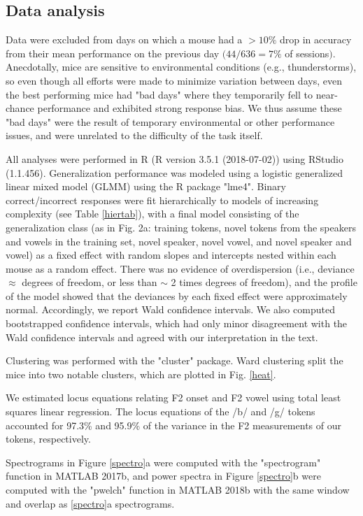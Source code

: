 \documentclass[11pt]{article}\usepackage[]{graphicx}\usepackage[]{color}
\begin{document}
\subsection{Data analysis}
Data were excluded from days on which a mouse had a $>10\%$ drop in accuracy from their mean performance on the previous day $(44/636 = 7\%$ of sessions$)$. Anecdotally, mice are sensitive to environmental conditions (e.g., thunderstorms), so even though all efforts were made to minimize variation between days, even the best performing mice had "bad days" where they temporarily fell to near-chance performance and exhibited strong response bias. We thus assume these "bad days" were the result of temporary environmental or other performance issues, and were unrelated to the difficulty of the task itself. 

All analyses were performed in R (R version 3.5.1 (2018-07-02))\cite{Team2016} using RStudio (1.1.456)\cite{Team2015}. Generalization performance was modeled using a logistic generalized linear mixed model (GLMM) using the R package "lme4"\cite{Bates2015}. Binary correct/incorrect responses were fit hierarchically to models of increasing complexity (see Table \ref{hiertab}), with a final model consisting of the generalization class (as in Fig. 2a: training tokens, novel tokens from the speakers and vowels in the training set, novel speaker, novel vowel, and novel speaker and vowel) as a fixed effect with random slopes and intercepts nested within each mouse as a random effect. There was no evidence of overdispersion (i.e., deviance $\approx$ degrees of freedom, or less than  $\sim$ 2 times degrees of freedom), and the profile of the model showed that the deviances by each fixed effect were approximately normal. Accordingly, we report Wald confidence intervals. We also computed bootstrapped confidence intervals, which had only minor disagreement with the Wald confidence intervals and agreed with our interpretation in the text.

Clustering was performed with the "cluster"\cite{Maechler2017} package. Ward clustering split the mice into two notable clusters, which are plotted in Fig. \ref{heat}.

We estimated locus equations relating F2 onset and F2 vowel using total least squares linear regression. The locus equations of the /b/ and /g/ tokens accounted for 97.3\% and 95.9\% of the variance in the F2 measurements of our tokens, respectively.

Spectrograms in Figure \ref{spectro}a were computed with the "spectrogram" function in MATLAB 2017b, and power spectra in Figure \ref{spectro}b were computed with the "pwelch" function in MATLAB 2018b with the same window and overlap as \ref{spectro}a spectrograms.
\end{document}
